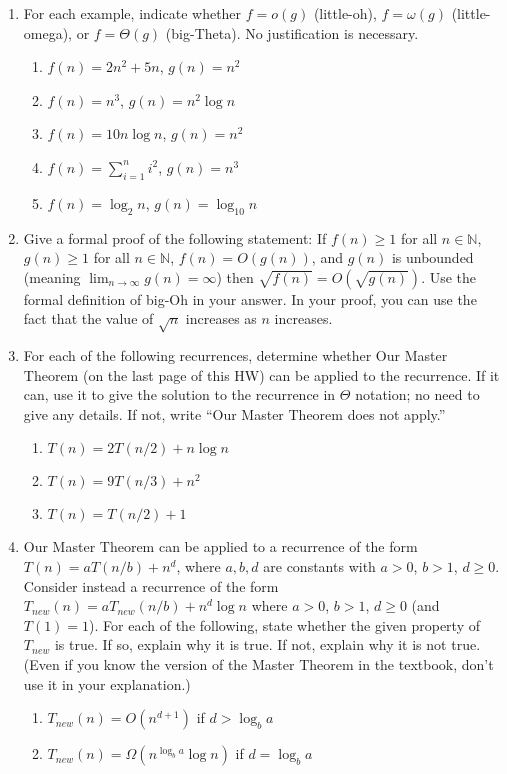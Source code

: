 \documentclass{article}
\begin{document}
\begin{enumerate}
    \item For each example, indicate whether $f = o(g)$ (little-oh), $f = \omega(g)$ (little-omega), or $f = \Theta(g)$ (big-Theta). No justification is necessary.
    \begin{enumerate}
        \item $f(n) = 2n^2 + 5n$, $g(n) = n^2$
        \item $f(n) = n^3$, $g(n) = n^2 \log n$
        \item $f(n) = 10n \log n$, $g(n) = n^2$
        \item $f(n) = \sum_{i=1}^n i^2$, $g(n) = n^3$
        \item $f(n) = \log_2 n$, $g(n) = \log_{10} n$
    \end{enumerate}

    \item Give a formal proof of the following statement: If $f(n) \ge 1$ for all $n \in \mathbb{N}$, $g(n) \ge 1$ for all $n \in \mathbb{N}$, $f(n) = O(g(n))$, and $g(n)$ is unbounded (meaning $\lim_{n \to \infty} g(n) = \infty$) then $\sqrt{f(n)} = O(\sqrt{g(n)})$. Use the formal definition of big-Oh in your answer.  In your proof, you can use the fact that the value of $\sqrt{n}$ increases as $n$ increases.

    \item For each of the following recurrences, determine whether Our Master Theorem (on the last page of this HW) can be applied to the recurrence. If it can, use it to give the solution to the recurrence in $\Theta$ notation; no need to give any details. If not, write “Our Master Theorem does not apply.”
    \begin{enumerate}
        \item $T(n) = 2T(n/2) + n \log n$
        \item $T(n) = 9T(n/3) + n^2$
        \item $T(n) = T(n/2) + 1$
    \end{enumerate}

    \item Our Master Theorem can be applied to a recurrence of the form $T(n) = aT(n/b) + n^d$, where $a, b, d$ are constants with $a > 0$, $b > 1$, $d \ge 0$. Consider instead a recurrence of the form $T_{new}(n) = aT_{new}(n/b) + n^d \log n$ where $a > 0$, $b > 1$, $d \ge 0$ (and $T(1) = 1$). For each of the following, state whether the given property of $T_{new}$ is true. If so, explain why it is true. If not, explain why it is not true. (Even if you know the version of the Master Theorem in the textbook, don’t use it in your explanation.)
    \begin{enumerate}
        \item $T_{new}(n) = O(n^{d+1})$ if $d > \log_b a$
        \item $T_{new}(n) = \Omega(n^{\log_b a} \log n)$ if $d = \log_b a$
    \end{enumerate}


\end{enumerate}
\end{document}
